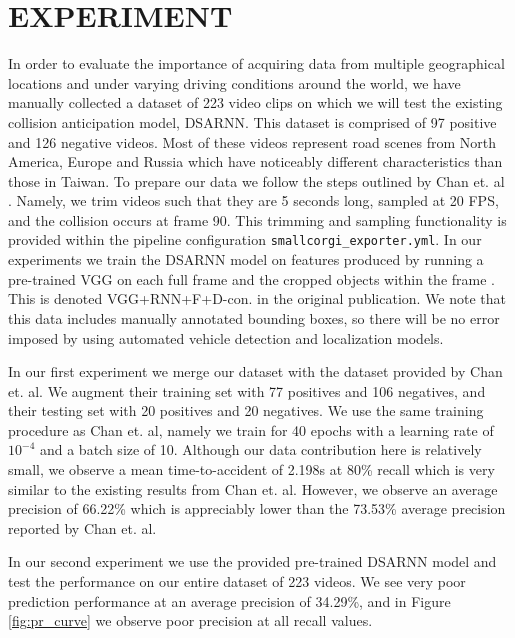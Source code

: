 \documentclass[letterpaper, 10 pt, conference]{IEEEconf}
\begin{document}
\section{EXPERIMENT}

In order to evaluate the importance of acquiring data from multiple geographical locations and under varying driving conditions around the world, we have manually collected a dataset of 223 video clips on which we will test the existing collision anticipation model, DSARNN. This dataset is comprised of 97 positive and 126 negative videos. Most of these videos represent road scenes from North America, Europe and Russia which have noticeably different characteristics than those in Taiwan. To prepare our data we follow the steps outlined by Chan et. al \cite{chan2016anticipating}. Namely, we trim videos such that they are 5 seconds long, sampled at 20 FPS, and the collision occurs at frame 90. This trimming and sampling functionality is provided within the pipeline configuration \texttt{smallcorgi\_exporter.yml}. In our experiments we train the DSARNN model on features produced by running a pre-trained VGG on each full frame and the cropped objects within the frame \cite{DBLP:journals/corr/SimonyanZ14a}. This is denoted VGG+RNN+F+D-con. in the original publication. We note that this data includes manually annotated bounding boxes, so there will be no error imposed by using automated vehicle detection and localization models.

In our first experiment we merge our dataset with the dataset provided by Chan et. al. We augment their training set with 77 positives and 106 negatives, and their testing set with 20 positives and 20 negatives. We use the same training procedure as Chan et. al, namely we train for 40 epochs with a learning rate of $10^{-4}$ and a batch size of 10. Although our data contribution here is relatively small, we observe a mean time-to-accident of 2.198s at 80\% recall which is very similar to the existing results from Chan et. al. However, we observe an average precision of 66.22\% which is appreciably lower than the 73.53\% average precision reported by Chan et. al. \cite{chan2016anticipating}

In our second experiment we use the provided pre-trained DSARNN model and test the performance on our entire dataset of 223 videos. We see very poor prediction performance at an average precision of 34.29\%, and in Figure \ref{fig:pr_curve} we observe poor precision at all recall values.
\end{document}

